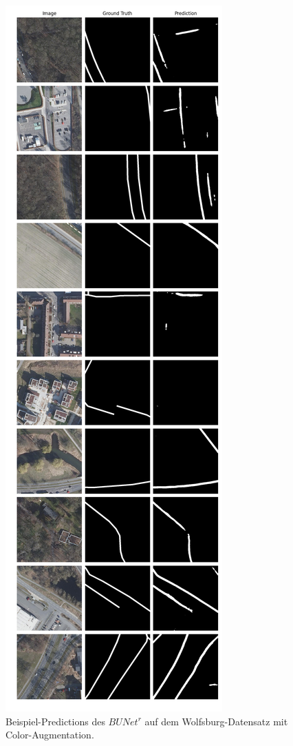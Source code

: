 \begin{figure}
	\centering
	\includegraphics[width=.41\textwidth]{Bilder/wolfsburg-color-samples/bunet15-r.png}
	\caption{Beispiel-Predictions des $BUNet^r$ auf dem Wolfsburg-Datensatz mit Color-Augmentation.}
	\label{fig:wolfsburg-color-samples-bunet15-r}
\end{figure}


